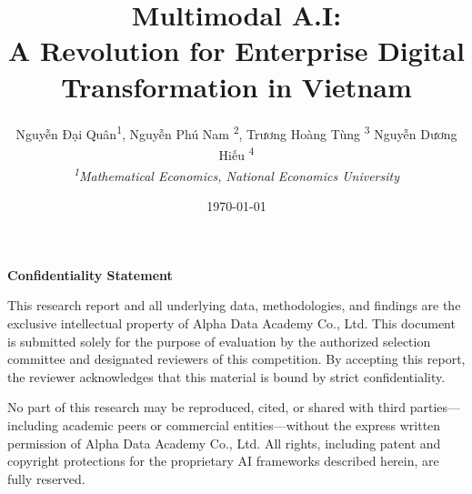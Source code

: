 \documentclass[12pt, a4paper]{article}
\title{
  \textbf{Multimodal A.I: \\
  A Revolution for Enterprise Digital Transformation in Vietnam}
}
\author{
  Nguyễn Đại Quân\texorpdfstring{\textsuperscript{1}}{[1]},
  Nguyễn Phú Nam \texorpdfstring{\textsuperscript{2}}{[2]},
  Trương Hoàng Tùng \texorpdfstring{\textsuperscript{3}}{[3]}
  Nguyễn Dương Hiếu \texorpdfstring{\textsuperscript{4}}{[4]} \\[6pt]
  \small\textit{\texorpdfstring{\textsuperscript{1}}{[1]}Mathematical Economics, National Economics University} \\
}
\date{\today}
\begin{document}
\maketitle

\newpage
\vspace*{\fill}
\begin{center}
\textbf{\Large Confidentiality Statement}
\end{center}
\vspace{1cm}
\noindent This research report and all underlying data, methodologies, and findings are the exclusive intellectual property of Alpha Data Academy Co., Ltd. This document is submitted solely for the purpose of evaluation by the authorized selection committee and designated reviewers of this competition. By accepting this report, the reviewer acknowledges that this material is bound by strict confidentiality.

\vspace{0.5cm}
\noindent No part of this research may be reproduced, cited, or shared with third parties---including academic peers or commercial entities---without the express written permission of Alpha Data Academy Co., Ltd. All rights, including patent and copyright protections for the proprietary AI frameworks described herein, are fully reserved.
\vspace*{\fill}
\newpage
\end{document}
